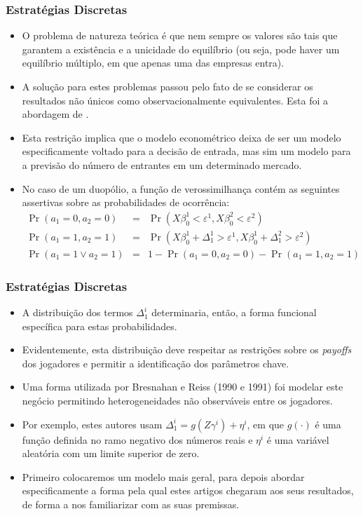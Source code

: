 \documentclass{beamer}
\begin{document}
\begin{frame}\frametitle{Estratégias Discretas}
\footnotesize
\begin{itemize}
\item O problema de natureza teórica é que nem sempre os valores são tais
que garantem a existência e a unicidade do equilíbrio (ou seja, pode
haver um equilíbrio múltiplo, em que apenas uma das empresas entra).
\item A solução para estes problemas passou pelo fato de se considerar os
resultados não únicos como observacionalmente equivalentes. Esta foi
a abordagem de \citet{Bresnahan1990}. 
\item Esta restrição implica que o modelo econométrico deixa de ser um modelo
especificamente voltado para a decisão de entrada, mas sim um modelo
para a previsão do número de entrantes em um determinado mercado. 
\item No caso de um duopólio, a função de verossimilhança contém as seguintes
assertivas sobre as probabilidades de ocorrência:
\begin{eqnarray*}
\Pr(a_{1}=0,a_{2}=0) & = & \Pr(X\beta_{0}^{1}<\varepsilon^{1},X\beta_{0}^{2}<\varepsilon^{2})\\
\Pr(a_{1}=1,a_{2}=1) & = & \Pr(X\beta_{0}^{1}+\Delta_{1}^{1}>\varepsilon^{1},X\beta_{0}^{1}+\Delta_{1}^{2}>\varepsilon^{2})\\
\Pr(a_{1}=1\vee a_{2}=1) & = & 1-\Pr(a_{1}=0,a_{2}=0)-\Pr(a_{1}=1,a_{2}=1)
\end{eqnarray*}
\end{itemize}
\end{frame}

\begin{frame}\frametitle{Estratégias Discretas}
\small
\begin{itemize}
\item A distribuição dos termos $\Delta_{1}^{i}$ determinaria, então, a
forma funcional específica para estas probabilidades. 
\item Evidentemente, esta distribuição deve respeitar as restrições sobre
os \emph{payoffs} dos jogadores e permitir a identificação dos parâmetros
chave. 
\item Uma forma utilizada por Bresnahan e Reiss (1990 e 1991) foi modelar
este negócio permitindo heterogeneidades não observáveis entre os
jogadores. 
\item Por exemplo, estes autores usam $\Delta_{1}^{i}=g(Z\gamma^{i})+\eta^{i}$,
em que $g(\cdot)$ é uma função definida no ramo negativo dos números
reais e $\eta^{i}$ é uma variável aleatória com um limite superior
de zero. 
\item Primeiro colocaremos um modelo mais geral, para depois abordar especificamente
a forma pela qual estes artigos chegaram aos seus resultados, de forma
a nos familiarizar com as suas premissas.
\end{itemize}
\end{frame}
\end{document}
